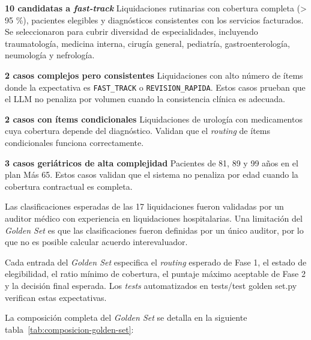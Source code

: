 \textbf{10 candidatas a \textit{fast-track}} Liquidaciones rutinarias con cobertura completa (> 95 \%), pacientes elegibles y diagnósticos consistentes con los servicios facturados. Se seleccionaron para cubrir diversidad de especialidades, incluyendo traumatología, medicina interna, cirugía general, pediatría, gastroenterología, neumología y nefrología.

\textbf{2 casos complejos pero consistentes} Liquidaciones con alto número de ítems donde la expectativa es \texttt{FAST\_TRACK} o \texttt{REVISION\_RAPIDA}. Estos casos prueban que el LLM no penaliza por volumen cuando la consistencia clínica es adecuada.

\textbf{2 casos con ítems condicionales} Liquidaciones de urología con medicamentos cuya cobertura depende del diagnóstico. Validan que el \textit{routing} de ítems condicionales funciona correctamente.

\textbf{3 casos geriátricos de alta complejidad} Pacientes de 81, 89 y 99 años en el plan Más 65. Estos casos validan que el sistema no penaliza por edad cuando la cobertura contractual es completa.

Las clasificaciones esperadas de las 17 liquidaciones fueron validadas por un auditor médico con experiencia en liquidaciones hospitalarias. Una limitación del \textit{Golden Set} es que las clasificaciones fueron definidas por un único auditor, por lo que no es posible calcular acuerdo interevaluador.

Cada entrada del \textit{Golden Set} especifica el \textit{routing} esperado de Fase 1, el estado de elegibilidad, el ratio mínimo de cobertura, el puntaje máximo aceptable de Fase 2 y la decisión final esperada. Los \textit{tests} automatizados en tests/test golden set.py verifican estas expectativas.

La composición completa del \textit{Golden Set} se detalla en la siguiente tabla~\ref{tab:composicion-golden-set}:

